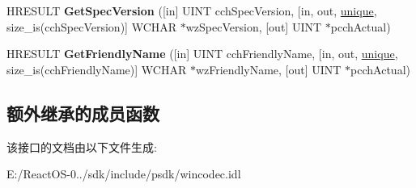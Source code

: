 \begin{DoxyCompactItemize}
H\+R\+E\+S\+U\+LT {\bfseries Get\+Spec\+Version} (\mbox{[}in\mbox{]} U\+I\+NT cch\+Spec\+Version, \mbox{[}in, out, \hyperlink{interfaceunique}{unique}, size\+\_\+is(cch\+Spec\+Version)\mbox{]} W\+C\+H\+AR $\ast$wz\+Spec\+Version, \mbox{[}out\mbox{]} U\+I\+NT $\ast$pcch\+Actual)
\item 
\mbox{\label{interface_i_w_i_c_component_info_ac2a7d262bc5f7814260654fd0095aa49}} 
H\+R\+E\+S\+U\+LT {\bfseries Get\+Friendly\+Name} (\mbox{[}in\mbox{]} U\+I\+NT cch\+Friendly\+Name, \mbox{[}in, out, \hyperlink{interfaceunique}{unique}, size\+\_\+is(cch\+Friendly\+Name)\mbox{]} W\+C\+H\+AR $\ast$wz\+Friendly\+Name, \mbox{[}out\mbox{]} U\+I\+NT $\ast$pcch\+Actual)
\end{DoxyCompactItemize}
\subsection*{额外继承的成员函数}


该接口的文档由以下文件生成\+:\begin{DoxyCompactItemize}
\item 
E\+:/\+React\+O\+S-\/0../sdk/include/psdk/wincodec.\+idl\end{DoxyCompactItemize}
